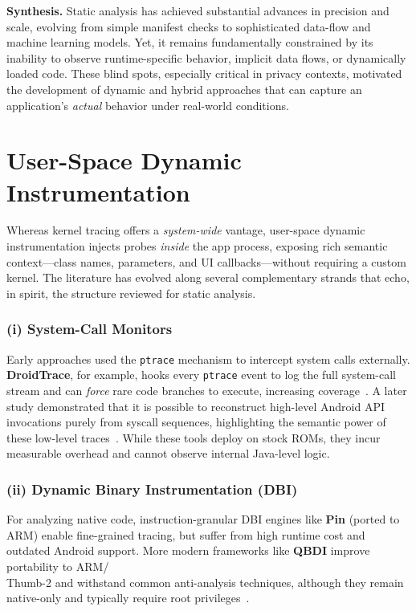 \documentclass[a4paper,12pt]{report}
\begin{document}
\medskip
\noindent\textbf{Synthesis.}
Static analysis has achieved substantial advances in precision and scale, evolving from simple manifest checks to sophisticated data-flow and machine learning models. Yet, it remains fundamentally constrained by its inability to observe runtime-specific behavior, implicit data flows, or dynamically loaded code. These blind spots, especially critical in privacy contexts, motivated the development of dynamic and hybrid approaches that can capture an application's \emph{actual} behavior under real-world conditions.


\section{User-Space Dynamic Instrumentation}
\label{sec:rw:dynamic:user}

Whereas kernel tracing offers a \emph{system-wide} vantage, user-space dynamic instrumentation injects probes \emph{inside} the app process, exposing rich semantic context—class names, parameters, and UI callbacks—without requiring a custom kernel. The literature has evolved along several complementary strands that echo, in spirit, the structure reviewed for static analysis.

\subsubsection*{(i) System-Call Monitors}
Early approaches used the \texttt{ptrace} mechanism to intercept system calls externally. \textbf{DroidTrace}, for example, hooks every \texttt{ptrace} event to log the full system-call stream and can \emph{force} rare code branches to execute, increasing coverage~\cite{zheng2014droidtrace}. A later study demonstrated that it is possible to reconstruct high-level Android API invocations purely from syscall sequences, highlighting the semantic power of these low-level traces~\cite{nisi2019syscall}. While these tools deploy on stock ROMs, they incur measurable overhead and cannot observe internal Java-level logic.

\subsubsection*{(ii) Dynamic Binary Instrumentation (DBI)}
For analyzing native code, instruction-granular DBI engines like \textbf{Pin} (ported to ARM) enable fine-grained tracing, but suffer from high runtime cost and outdated Android support. More modern frameworks like \textbf{QBDI} improve portability to ARM/ \\Thumb-2 and withstand common anti-analysis techniques, although they remain native-only and typically require root privileges~\cite{qbdiblackhat2020}.
\end{document}
